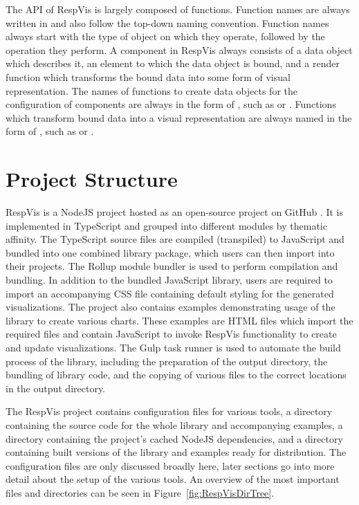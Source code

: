 The API of RespVis is largely composed of functions. Function names
are always written in  \parencite{camelCase} and also
follow the top-down naming convention. Function names always start
with the type of object on which they operate, followed by the
operation they perform. A component in RespVis always consists of a
data object which describes it, an element to which the data object is
bound, and a render function which transforms the bound data into some
form of visual representation. The names of functions to create data
objects for the configuration of components are always in the form of
, such as  or
. Functions which transform bound data into
a visual representation are always named in the form of
, such as  or
.






\section{Project Structure}
\label{sec:ProjectSetup}

RespVis is a NodeJS \parencite{NodeJS} project hosted as an
open-source project on GitHub \parencite{RespVisGitHub}. It is
implemented in TypeScript and grouped into different modules by
thematic affinity. The TypeScript source files are compiled
(transpiled) to JavaScript and bundled into one combined library
package, which users can then import into their projects.
%
The Rollup module bundler \parencite{Rollup} is used to perform
compilation and bundling. In addition to the bundled JavaScript
library, users are required to import an accompanying CSS file
containing default styling for the generated visualizations. The
project also contains examples demonstrating usage of the library to
create various charts. These examples are HTML files which import the
required files and contain JavaScript to invoke RespVis functionality
to create and update visualizations.
%
The Gulp \parencite{Gulp} task runner is used to automate the build
process of the library, including the preparation of the output
directory, the bundling of library code, and the copying of various
files to the correct locations in the output directory.




The RespVis project contains configuration files for various tools, a
 directory containing the source code for the whole library
and accompanying examples, a  directory containing
the project's cached NodeJS dependencies, and a  directory
containing built versions of the library and examples ready for
distribution. The configuration files are only discussed broadly here,
later sections go into more detail about the setup of the various
tools. An overview of the most important files and directories can be
seen in Figure~\ref{fig:RespVisDirTree}.

